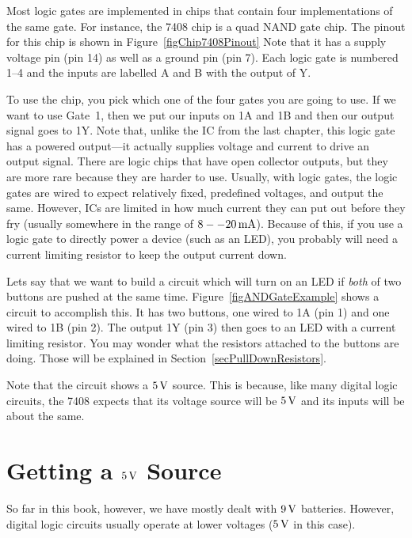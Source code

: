 
Most logic gates are implemented in chips that contain four implementations of the same gate.
For instance, the 7408 chip is a quad NAND gate chip.
The pinout for this chip is shown in Figure~\ref{figChip7408Pinout}
Note that it has a supply voltage pin (pin 14) as well as a ground pin (pin 7).
Each logic gate is numbered 1--4 and the inputs are labelled A and B with the output of Y.

To use the chip, you pick which one of the four gates you are going to use.
If we want to use Gate~1, then we put our inputs on 1A and 1B and then our output signal goes to 1Y.
Note that, unlike the IC from the last chapter, this logic gate has a powered output---it actually supplies voltage and current to drive an output signal.
There are logic chips that have open collector outputs, but they are more rare because they are harder to use.
Usually, with logic gates, the logic gates are wired to expect relatively fixed, predefined voltages, and output the same.
However, ICs are limited in how much current they can put out before they fry (usually somewhere in the range of $8--20\,\si{\milli\ampere}$).
Because of this, if you use a logic gate to directly power a device (such as an LED), you probably will need a current limiting resistor to keep the output current down.


Lets say that we want to build a circuit which will turn on an LED if \emph{both} of two buttons are pushed at the same time.
Figure~\ref{figANDGateExample} shows a circuit to accomplish this.
It has two buttons, one wired to 1A (pin 1) and one wired to 1B (pin 2).
The output 1Y (pin 3) then goes to an LED with a current limiting resistor.
You may wonder what the resistors attached to the buttons are doing.
Those will be explained in Section~\ref{secPullDownResistors}.

Note that the circuit shows a $5\,\si{\volt}$ source.
This is because, like many digital logic circuits, the 7408 expects that its voltage source will be $5\,\si{\volt}$ and its inputs will be about the same.

\section{Getting a $5\,\si{\volt}$ Source}

So far in this book, however, we have mostly dealt with $9\,\si{\volt}$ batteries.
However, digital logic circuits usually operate at lower voltages ($5\,\si{\volt}$ in this case).

